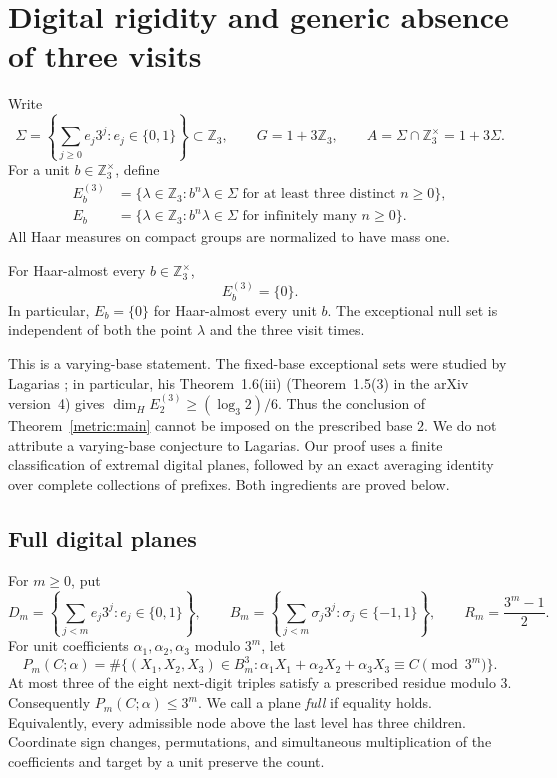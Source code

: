 
\section{Digital rigidity and generic absence of three visits}
\label{metric:section}

Write
\[
 \Sigma=\left\{\sum_{j\geq0}e_j3^j:e_j\in\{0,1\}\right\}
 \subset\mathbb Z_3,\qquad G=1+3\mathbb Z_3,\qquad
 A=\Sigma\cap\mathbb Z_3^\times=1+3\Sigma.
\]
For a unit $b\in\mathbb Z_3^\times$, define
\[
 \begin{aligned}
 E_b^{(3)}&=\{\lambda\in\mathbb Z_3:
       b^n\lambda\in\Sigma\text{ for at least three distinct }n\geq0\},\\
 E_b&=\{\lambda\in\mathbb Z_3:
       b^n\lambda\in\Sigma\text{ for infinitely many }n\geq0\}.
 \end{aligned}
\]
All Haar measures on compact groups are normalized to have mass one.

\begin{theorem}\label{metric:main}
For Haar-almost every $b\in\mathbb Z_3^\times$,
\[
                         E_b^{(3)}=\{0\}.
\]
In particular, $E_b=\{0\}$ for Haar-almost every unit $b$.
The exceptional null set is independent of both the point $\lambda$ and
the three visit times.
\end{theorem}

This is a varying-base statement. The fixed-base exceptional sets were
studied by Lagarias \cite{Lagarias}; in particular, his
Theorem~1.6(iii) (Theorem~1.5(3) in the arXiv version~4) gives
$\dim_H E_2^{(3)}\geq (\log_3 2)/6$.
Thus the conclusion of Theorem~\ref{metric:main} cannot be imposed on the
prescribed base $2$. We do not attribute a varying-base conjecture to
Lagarias. Our proof uses a finite classification of extremal digital
planes, followed by an exact averaging identity over complete collections
of prefixes. Both ingredients are proved below.

\subsection{Full digital planes}

For $m\geq0$, put
\[
 D_m=\left\{\sum_{j<m}e_j3^j:e_j\in\{0,1\}\right\},\qquad
 B_m=\left\{\sum_{j<m}\sigma_j3^j:\sigma_j\in\{-1,1\}\right\},
 \qquad R_m=\frac{3^m-1}{2}.
\]
For unit coefficients $\alpha_1,\alpha_2,\alpha_3$ modulo $3^m$, let
\[
 P_m(C;\alpha)=\#\{(X_1,X_2,X_3)\in B_m^3:
               \alpha_1X_1+\alpha_2X_2+\alpha_3X_3\equiv C\pmod{3^m}\}.
\]
At most three of the eight next-digit triples satisfy a prescribed
residue modulo $3$. Consequently $P_m(C;\alpha)\leq3^m$.
We call a plane \emph{full} if equality holds. Equivalently, every
admissible node above the last level has three children.
Coordinate sign changes, permutations, and simultaneous multiplication
of the coefficients and target by a unit preserve the count.

